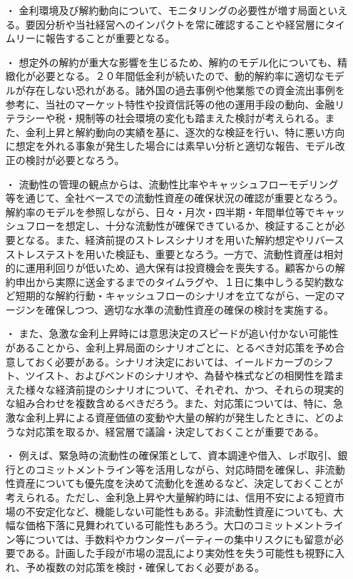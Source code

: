 \documentclass[report,gutter=10mm,fore-edge=10mm,uplatex,dvipdfmx]{jlreq}
\begin{document}
\begin{itemize}
 \item [・]  金利環境及び解約動向について、モニタリングの必要性が増す局面といえる。要因分析や当社経営へのインパクトを常に確認することや経営層にタイムリーに報告することが重要となる。
 \item [・]  想定外の解約が重大な影響を生じるため、解約のモデル化についても、精緻化が必要となる。２０年間低金利が続いたので、動的解約率に適切なモデルが存在しない恐れがある。諸外国の過去事例や他業態での資金流出事例を参考に、当社のマーケット特性や投資信託等の他の運用手段の動向、金融リテラシーや税・規制等の社会環境の変化も踏まえた検討が考えられる。また、金利上昇と解約動向の実績を基に、逐次的な検証を行い、特に悪い方向に想定を外れる事象が発生した場合には素早い分析と適切な報告、モデル改正の検討が必要となろう。
 \item [・]  流動性の管理の観点からは、流動性比率やキャッシュフローモデリング等を通じて、全社ベースでの流動性資産の確保状況の確認が重要となろう。解約率のモデルを参照しながら、日々・月次・四半期・年間単位等でキャッシュフローを想定し、十分な流動性が確保できているか、検証することが必要となる。また、経済前提のストレスシナリオを用いた解約想定やリバースストレステストを用いた検証も、重要となろう。一方で、流動性資産は相対的に運用利回りが低いため、過大保有は投資機会を喪失する。顧客からの解約申出から実際に送金するまでのタイムラグや、１日に集中しうる契約数など短期的な解約行動・キャッシュフローのシナリオを立てながら、一定のマージンを確保しつつ、適切な水準の流動性資産の確保の検討を実施する。
 \item [・]  また、急激な金利上昇時には意思決定のスピードが追い付かない可能性があることから、金利上昇局面のシナリオごとに、とるべき対応策を予め合意しておく必要がある。シナリオ決定においては、イールドカーブのシフト、ツイスト、およびベンドのシナリオや、為替や株式などの相関性を踏まえた様々な経済前提のシナリオについて、それぞれ、かつ、それらの現実的な組み合わせを複数含めるべきだろう。また、対応策については、特に、急激な金利上昇による資産価値の変動や大量の解約が発生したときに、どのような対応策を取るか、経営層で議論・決定しておくことが重要である。
 \item [・]  例えば、緊急時の流動性の確保策として、資本調達や借入、レポ取引、銀行とのコミットメントライン等を活用しながら、対応時間を確保し、非流動性資産についても優先度を決めて流動化を進めるなど、決定しておくことが考えられる。ただし、金利急上昇や大量解約時には、信用不安による短資市場の不安定化など、機能しない可能性もある。非流動性資産についても、大幅な価格下落に見舞われている可能性もあろう。大口のコミットメントライン等については、手数料やカウンターパーティーの集中リスクにも留意が必要である。計画した手段が市場の混乱により実効性を失う可能性も視野に入れ、予め複数の対応策を検討・確保しておく必要がある。

\end{itemize}
\end{document}
